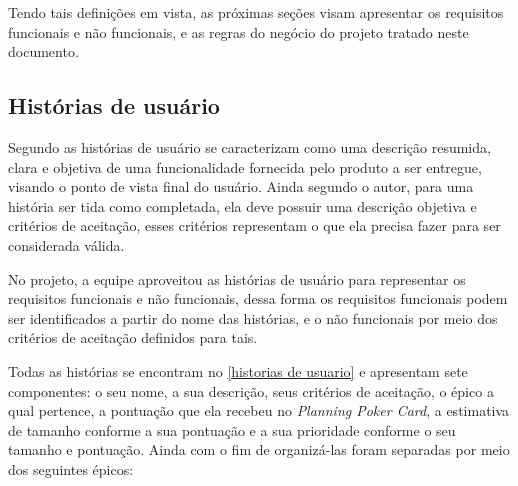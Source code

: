 Tendo tais definições em vista, as próximas seções visam apresentar os requisitos funcionais e não funcionais, e as regras do negócio do projeto tratado neste documento. 

\subsection{Histórias de usuário}
Segundo  as histórias de usuário se caracterizam como uma descrição resumida, clara e objetiva de uma funcionalidade fornecida pelo produto a ser entregue, visando o ponto de vista final do usuário. Ainda segundo o autor, para uma história ser tida como completada, ela deve possuir uma descrição objetiva e critérios de aceitação, esses critérios representam o que ela precisa fazer para ser considerada válida.

No projeto, a equipe aproveitou as histórias de usuário para representar os requisitos funcionais e não funcionais, dessa forma os requisitos funcionais podem ser identificados a partir do nome das histórias, e o não funcionais por meio dos critérios de aceitação definidos para tais.

Todas as histórias se encontram no \autoref{historias de usuario} e apresentam sete componentes: o seu nome, a sua descrição, seus critérios de aceitação, o épico a qual pertence, a pontuação que ela recebeu no \textsl{Planning Poker Card}, a estimativa de tamanho conforme a sua pontuação e a sua prioridade conforme o seu tamanho e pontuação. Ainda com o fim de organizá-las foram separadas por meio dos seguintes épicos:

